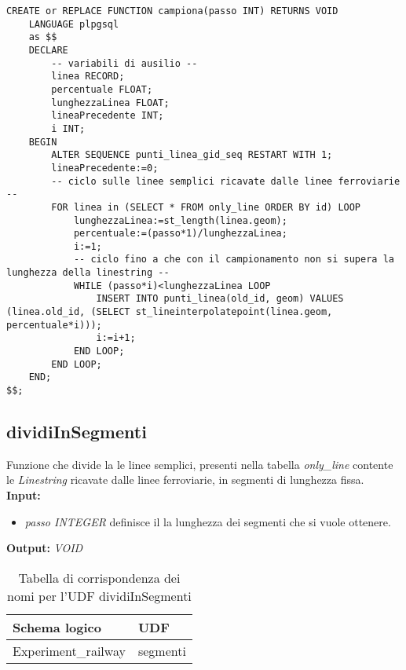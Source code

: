 \begin{lstlisting}[style=mySQL]
CREATE or REPLACE FUNCTION campiona(passo INT) RETURNS VOID
	LANGUAGE plpgsql
	as $$
	DECLARE
		-- variabili di ausilio --
		linea RECORD;
		percentuale FLOAT;
		lunghezzaLinea FLOAT;
		lineaPrecedente INT;
		i INT;
	BEGIN
		ALTER SEQUENCE punti_linea_gid_seq RESTART WITH 1;
		lineaPrecedente:=0;
		-- ciclo sulle linee semplici ricavate dalle linee ferroviarie --
		FOR linea in (SELECT * FROM only_line ORDER BY id) LOOP
			lunghezzaLinea:=st_length(linea.geom);
			percentuale:=(passo*1)/lunghezzaLinea;
			i:=1;
			-- ciclo fino a che con il campionamento non si supera la lunghezza della linestring --
			WHILE (passo*i)<lunghezzaLinea LOOP
				INSERT INTO punti_linea(old_id, geom) VALUES (linea.old_id, (SELECT st_lineinterpolatepoint(linea.geom, percentuale*i)));
				i:=i+1;
			END LOOP;
		END LOOP;
	END;
$$;
\end{lstlisting}

\subsection{dividiInSegmenti}
Funzione che divide la le linee semplici, presenti nella tabella \textit{only\_line} contente le \textit{Linestring} ricavate dalle linee ferroviarie, in segmenti di lunghezza fissa.\\
\textbf{Input:} 
\begin{itemize}
\item \textit{passo INTEGER} definisce il la lunghezza dei segmenti che si vuole ottenere.
\end{itemize}
\textbf{Output:} \textit{VOID} 

\begin{table}[h]
\centering
\caption{Tabella di corrispondenza dei nomi per l'UDF dividiInSegmenti}
\label{mapTb6}
\begin{tabular}{|l|l|}
\hline
Schema logico       & UDF                \\ \hline
Experiment\_railway          & segmenti              \\ \hline
\end{tabular}
\end{table}

